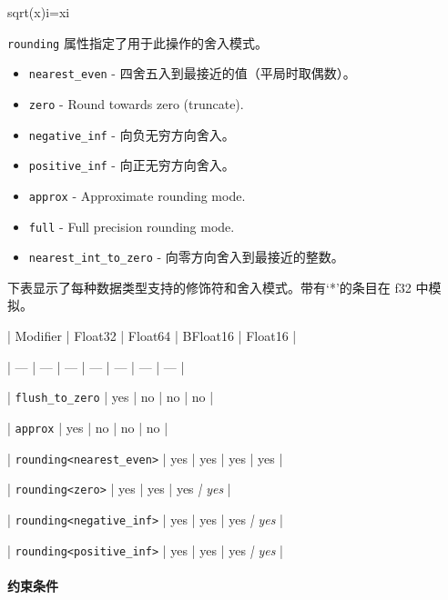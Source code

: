 \documentclass{article}
\begin{document}
sqrt(x)i=xi


\texttt{rounding} 属性指定了用于此操作的舍入模式。



\begin{itemize}
\item \texttt{nearest\_even} - 四舍五入到最接近的值（平局时取偶数）。
\item \texttt{zero} - Round towards zero (truncate).

\item \texttt{negative\_inf} - 向负无穷方向舍入。
\item \texttt{positive\_inf} - 向正无穷方向舍入。
\item \texttt{approx} - Approximate rounding mode.

\item \texttt{full} - Full precision rounding mode.

\item \texttt{nearest\_int\_to\_zero} - 向零方向舍入到最接近的整数。


\end{itemize}
下表显示了每种数据类型支持的修饰符和舍入模式。带有`*'的条目在 f32 中模拟。



| Modifier | Float32 | Float64 | BFloat16 | Float16 |


| --- | --- | --- | --- | --- | --- | --- |


| \texttt{flush\_to\_zero} | yes | no | no | no |


| \texttt{approx} | yes | no | no | no |


| \texttt{rounding<nearest\_even>} | yes | yes | yes | yes |


| \texttt{rounding<zero>} | yes | yes | yes\textit{ | yes} |


| \texttt{rounding<negative\_inf>} | yes | yes | yes\textit{ | yes} |


| \texttt{rounding<positive\_inf>} | yes | yes | yes\textit{ | yes} |






\paragraph{约束条件}
\end{document}
